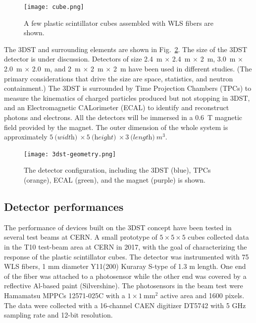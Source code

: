 \begin{figure}
\begin{center}
  \texttt{[image: cube.png]}
\caption{\label{fig:cube}
A few plastic scintillator cubes assembled with WLS fibers are shown.}
\end{center}
\end{figure}

The 3DST and surrounding elements are shown in Fig.~\ref{fig:3dst-geometry}.  The size of the 3DST detector is under discussion.  Detectors of size 2.4~m $\times$ 2.4~m $\times$ 2~m, 3.0~m $\times$ 2.0~m $\times$ 2.0~m, and 2~m $\times$ 2~m $\times$ 2~m have been used in different studies.  (The primary considerations that drive the size are space, statistics, and neutron containment.)
The 3DST is surrounded by Time Projection Chambers (TPCs) to measure the kinematics of charged particles produced but not stopping in 3DST, and an Electromagnetic CALorimeter (ECAL) to identify and reconstruct photons and electrons. All the detectors will be immersed in a 0.6~T magnetic field provided by the magnet. The outer dimension of the whole system is approximately $5~\textit{(width)}~ \times 5~\textit{(height)}~ \times 3~\textit{(length)}~\textit{m}^3$. 


\begin{figure}
\begin{center}
  \texttt{[image: 3dst-geometry.png]}
\caption{\label{fig:3dst-geometry}
The detector configuration, including the 3DST (blue), TPCs (orange), ECAL (green), and the magnet (purple) is shown.} 
\end{center}
\end{figure}



\subsection{Detector performances}

The performance of devices built on the 3DST concept have been tested in several test beams at CERN.
A small prototype of $5\times5\times5$ cubes collected data in the T10 test-beam area at CERN in 2017, with the goal of characterizing the response of the plastic scintillator cubes.
The detector was instrumented with 75 WLS fibers, 1 mm diameter Y11(200) Kuraray S-type of 1.3 m length. One end of the fiber was attached to a photosensor while the other end was covered by a reflective Al-based paint (Silvershine). The photosensors in the beam test were Hamamatsu MPPCs 12571-025C with a $1\times1~\text{mm}^2$ active area and 1600 pixels. The data were collected with a 16-channel CAEN digitizer DT5742 with 5 GHz sampling rate and 12-bit resolution.

